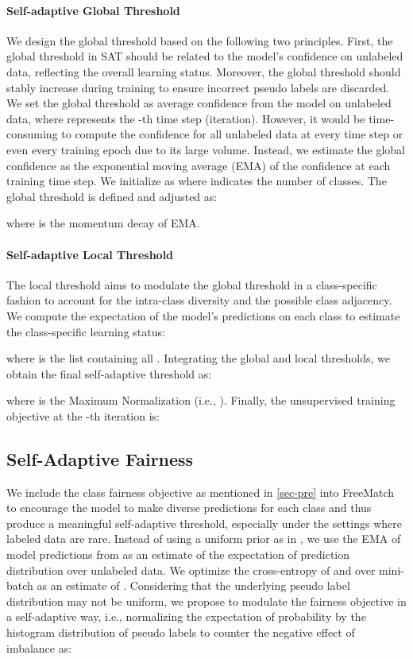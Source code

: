 \documentclass{article} \usepackage{iclr2023_conference,times}
\theoremstyle{plain}
\theoremstyle{definition}
\theoremstyle{remark}
\newcommand{\revision}[1]{{\color{black}{#1}}}
\begin{document}
\paragraph{Self-adaptive Global Threshold}

We design the global threshold based on the following two principles.
First, the global threshold in SAT should be related to the model's confidence on unlabeled data, reflecting the overall learning status.
Moreover, the global threshold should stably increase during training to ensure incorrect pseudo labels are discarded.
We set the global threshold  as average confidence from the model on unlabeled data, where  represents the -th time step (iteration).
However, it would be time-consuming to compute the confidence for all unlabeled data at every time step or even every training epoch due to its large volume.
Instead, we estimate the global confidence as the exponential moving average (EMA) of the confidence at each training time step.
We initialize  as  where  indicates the number of classes.
The global threshold  is defined and adjusted as:

where  is the momentum decay of EMA.

\paragraph{Self-adaptive Local Threshold}

The local threshold aims to modulate the global threshold in a class-specific fashion to account for the intra-class diversity and the possible class adjacency.
We compute the expectation of the model’s predictions on each class  to estimate the class-specific learning status:

where  is the list containing all .
Integrating the global and local thresholds, we obtain the final self-adaptive threshold  as: 

where  is the Maximum Normalization (i.e., ). 
Finally, the unsupervised training objective  at the -th iteration is:




\subsection{Self-Adaptive Fairness}
\label{sec-fairness}

We include the class fairness objective as mentioned in \cref{sec-pre} into FreeMatch to encourage the model to make diverse predictions for each class and thus produce a meaningful self-adaptive threshold, especially under the settings where labeled data are rare.
Instead of using a uniform prior as in \citep{arazo2020pseudo}, we use the EMA of model predictions  from \revision{Eq.~\ref{eq-salt}} as an estimate of the expectation of prediction distribution over unlabeled data.
We optimize the cross-entropy of  and  over mini-batch as an estimate of .
Considering that the underlying pseudo label distribution may not be uniform, we propose to modulate the fairness objective in a self-adaptive way, i.e., normalizing the expectation of probability by the histogram distribution of pseudo labels to counter the negative effect of imbalance as:
\end{document}
